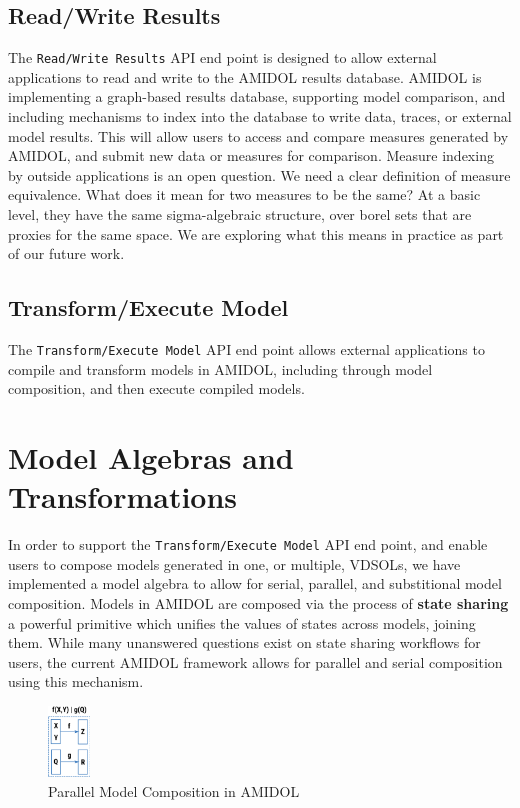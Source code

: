 \documentclass[12pt]{galois-whitepaper}
\begin{document}
\subsection{Read/Write Results}

The \texttt{Read/Write Results} API end point is designed to allow
external applications to read and write to the AMIDOL results
database.  AMIDOL is implementing a graph-based results database,
supporting model comparison, and including mechanisms to index into
the database to write data, traces, or external model results.  This
will allow users to access and compare measures generated by AMIDOL,
and submit new data or measures for comparison.  Measure indexing by
outside applications is an open question.  We need a clear definition
of measure equivalence.  What does it mean for two measures to be the
same?  At a basic level, they have the same sigma-algebraic structure,
over borel sets that are proxies for the same space.  We are exploring
what this means in practice as part of our future work.

\subsection{Transform/Execute Model}

The \texttt{Transform/Execute Model} API end point allows external
applications to compile and transform models in AMIDOL, including
through model composition, and then execute compiled models.

\section{Model Algebras and Transformations}

In order to support the \texttt{Transform/Execute Model} API end
point, and enable users to compose models generated in one, or
multiple, VDSOLs, we have implemented a model algebra to allow for
serial, parallel, and substitional model composition.  Models in
AMIDOL are composed via the process of \textbf{state sharing} a
powerful primitive which unifies the values of states across models,
joining them.  While many unanswered questions exist on state sharing
workflows for users, the current AMIDOL framework allows for parallel
and serial
composition using this mechanism.

\begin{figure}
  \centering
  \includegraphics[width=0.1\textwidth]{figs/parallel.png}
  \caption{Parallel Model Composition in AMIDOL}
  \label{Fig:Parallel}
\end{figure}
\end{document}
